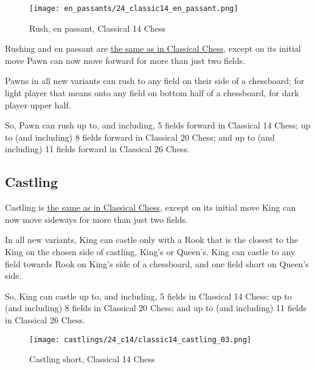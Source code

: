\noindent
\begin{wrapfigure}{l}{0.4\textwidth}
\centering
\texttt{[image: en\_passants/24\_classic14\_en\_passant.png]}
\caption{Rush, en passant, Classical 14 Chess}
\label{fig:24_classic14_en_passant}
\end{wrapfigure}
Rushing and en passant are
\href{https://en.wikipedia.org/wiki/En\_passant}{the same as in Classical Chess},
except on its initial move Pawn can now move forward for more than just two
fields.

Pawns in all new variants can rush to any field on their side of a chessboard;
for light player that means onto any field on bottom half of a chessboard, for
dark player upper half.

So, Pawn can rush up to, and including, 5 fields forward in Classical 14 Chess;
up to (and including) 8 fields forward in Classical 20 Chess; and up to (and
including) 11 fields forward in Classical 26 Chess.


\subsection*{Castling}
\label{sec:Simple variants/Classical Chess variants/Castling}

Castling is
\href{https://en.wikipedia.org/wiki/Castling}{the same as in Classical Chess},
except on its initial move King can now move sideways for more than just two
fields.

In all new variants, King can castle only with a Rook that is the closest to the
King on the chosen side of castling, King's or Queen's. King can castle to any
field towards Rook on King's side of a chessboard, and one field short on Queen's
side.

So, King can castle up to, and including, 5 fields in Classical 14 Chess;
up to (and including) 8 fields in Classical 20 Chess; and up to (and
including) 11 fields in Classical 26 Chess.

\noindent
\begin{figure}[!h]
\texttt{[image: castlings/24\_c14/classic14\_castling\_03.png]}
\vspace*{-1.4\baselineskip}
\caption{Castling short, Classical 14 Chess}
\label{fig:classic14_castling_03}
\end{figure}

